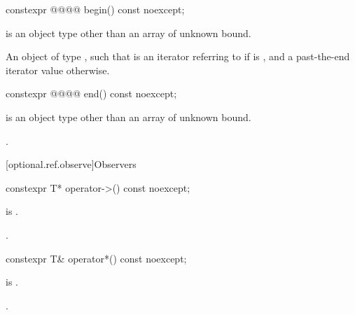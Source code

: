 %
\begin{itemdecl}
constexpr @@@@ begin() const noexcept;
\end{itemdecl}

\begin{itemdescr}
\begin{removedblock}
\pnum
\constraints
{} is an object type other than an array of unknown bound.
\end{removedblock}

\pnum
\returns
An object  of type , such that  is an iterator referring to  if  is , and a past-the-end iterator value otherwise.
\end{itemdescr}

%
\begin{itemdecl}
constexpr @@@@ end() const noexcept;
\end{itemdecl}

\begin{itemdescr}
\begin{removedblock}
\pnum
\constraints
{} is an object type other than an array of unknown bound.
\end{removedblock}

\pnum
\returns
{}.
\end{itemdescr}

[optional.ref.observe]{Observers}

%
\begin{itemdecl}
constexpr T* operator->() const noexcept;
\end{itemdecl}

\begin{itemdescr}
\pnum
\hardexpects
{} is .

\pnum
\returns
{}.
\end{itemdescr}

%
\begin{itemdecl}
constexpr T& operator*() const noexcept;
\end{itemdecl}

\begin{itemdescr}
\pnum
\hardexpects
{} is .

\pnum
\returns
{}.
\end{itemdescr}

